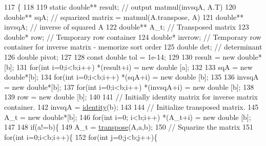 \begin{DoxyCode}
117                                           \{
118 
119     \textcolor{keyword}{static} \textcolor{keywordtype}{double}** result; \textcolor{comment}{// output matmul(invsqA, A.T)}
120     \textcolor{keywordtype}{double}** sqA; \textcolor{comment}{// squarized matrix = matmul(A.transpose, A)}
121     \textcolor{keywordtype}{double}** invsqA; \textcolor{comment}{// inverse of squared A}
122     \textcolor{keywordtype}{double}** A\_t; \textcolor{comment}{// Transposed matrix}
123     \textcolor{keywordtype}{double}* row; \textcolor{comment}{// Temporary row container}
124     \textcolor{keywordtype}{double}* invrow; \textcolor{comment}{// Temporary row container for inverse matrix - memorize sort order}
125     \textcolor{keywordtype}{double} det; \textcolor{comment}{// determinant}
126     \textcolor{keywordtype}{double} pivot;
127 
128     \textcolor{keyword}{const} \textcolor{keywordtype}{double} tol = 1e-14;
129 
130     result = \textcolor{keyword}{new} \textcolor{keywordtype}{double}*[b];
131     \textcolor{keywordflow}{for}(\textcolor{keywordtype}{int} i=0;i<b;i++) *(result+i) = \textcolor{keyword}{new} \textcolor{keywordtype}{double} [a];
132 
133     sqA = \textcolor{keyword}{new} \textcolor{keywordtype}{double}*[b];
134     \textcolor{keywordflow}{for}(\textcolor{keywordtype}{int} i=0;i<b;i++) *(sqA+i) = \textcolor{keyword}{new} \textcolor{keywordtype}{double} [b];
135 
136     invsqA = \textcolor{keyword}{new} \textcolor{keywordtype}{double}*[b];
137     \textcolor{keywordflow}{for}(\textcolor{keywordtype}{int} i=0;i<b;i++) *(invsqA+i) = \textcolor{keyword}{new} \textcolor{keywordtype}{double} [b];
138 
139     row = \textcolor{keyword}{new} \textcolor{keywordtype}{double} [b];
140 
141     \textcolor{comment}{// Initially identity matrix for inverse matrix container.}
142     invsqA = \hyperlink{Matrix_8C_affa4629470e427c236e2a7ac925e4e73}{identity}(b); 
143         
144     \textcolor{comment}{// Initialize transposed matrix.}
145     A\_t = \textcolor{keyword}{new} \textcolor{keywordtype}{double}*[b];
146     \textcolor{keywordflow}{for}(\textcolor{keywordtype}{int} i=0; i<b;i++) *(A\_t+i) = \textcolor{keyword}{new} \textcolor{keywordtype}{double} [b];
147     
148     \textcolor{keywordflow}{if}(a!=b)\{    
149         A\_t = \hyperlink{Matrix_8C_ab64223fbcc37cc3af54071e71067d05a}{transpose}(A,a,b);
150         \textcolor{comment}{// Squarize the matrix}
151         \textcolor{keywordflow}{for}(\textcolor{keywordtype}{int} i=0;i<b;i++)\{
152             \textcolor{keywordflow}{for}(\textcolor{keywordtype}{int} j=0;j<b;j++)\{

\end{DoxyCode}

